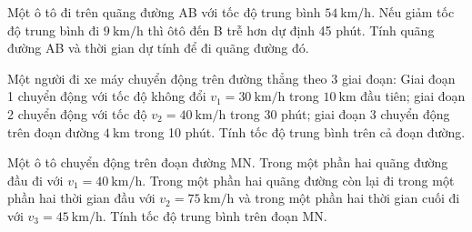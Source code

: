 \begin{ex}
	Một ô tô đi trên quãng đường AB với tốc độ trung bình $\SI{54}{\kilo\meter/\hour}$. Nếu giảm tốc độ trung bình đi $\SI{9}{\kilo\meter/\hour}$ thì ôtô đến B trễ hơn dự định 45 phút. Tính quãng đường AB và thời gian dự tính để đi quãng đường đó.
\end{ex}



\begin{ex}
	Một người đi xe máy chuyển động trên đường thẳng theo 3 giai đoạn: Giai đoạn 1 chuyển động với tốc độ không đổi $v_1 = \SI{30}{\kilo\meter/\hour}$ trong $\SI{10}{\kilo\meter}$ đầu tiên; giai đoạn 2 chuyển động với tốc độ $v_2 = \SI{40}{\kilo\meter/\hour}$ trong 30 phút; giai đoạn 3 chuyển động trên đoạn đường $\SI{4}{\kilo\meter}$ trong 10 phút. Tính tốc độ trung bình trên cả đoạn đường.
\end{ex}

\begin{ex}
	Một ô tô chuyển động trên đoạn đường MN. Trong một phần hai quãng đường đầu đi với $v_1 = \SI{40}{\kilo\meter/\hour}$. Trong một phần hai quãng đường còn lại đi trong một phần hai thời gian đầu với $v_2 = \SI{75}{\kilo\meter/\hour}$ và trong một phần hai thời gian cuối đi với $v_3 = \SI{45}{\kilo\meter/\hour}$. Tính tốc độ trung bình trên đoạn MN.
\end{ex}





